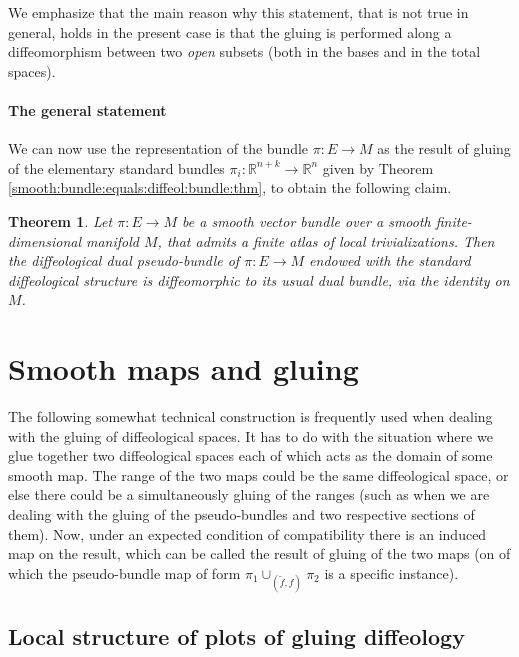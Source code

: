 \documentclass{article}
\newtheorem{thm}[lemma]{Theorem}
\newcommand\matR{{\mathbb{R}}}
\begin{document}
We emphasize that the main reason why this statement, that is not true in general, holds in the present case is that the gluing is performed along a diffeomorphism between two \emph{open} subsets
(both in the bases and in the total spaces).

\paragraph{The general statement} We can now use the representation of the bundle $\pi:E\to M$ as the result of gluing of the elementary standard bundles $\pi_i:\matR^{n+k}\to\matR^n$ given by Theorem
\ref{smooth:bundle:equals:diffeol:bundle:thm}, to obtain the following claim.

\begin{thm}\label{dual:diffeo:equals:dual:standard:thm}
Let $\pi:E\to M$ be a smooth vector bundle over a smooth finite-dimensional manifold $M$, that admits a finite atlas of local trivializations. Then the diffeological dual pseudo-bundle of $\pi:E\to M$ endowed 
with the standard diffeological structure is diffeomorphic to its usual dual bundle, via the identity on $M$.
\end{thm}



\section{Smooth maps and gluing}

The following somewhat technical construction is frequently used when dealing with the gluing of diffeological spaces. It has to do with the situation where we glue together two diffeological spaces each of 
which acts as the domain of some smooth map. The range of the two maps could be the same diffeological space, or else there could be a simultaneously gluing of the ranges (such as when we are
dealing with the gluing of the pseudo-bundles and two respective sections of them). Now, under an expected condition of compatibility there is an induced map on the result, which can be called the
result of gluing of the two maps (on of which the pseudo-bundle map of form $\pi_1\cup_{(\tilde{f},f)}\pi_2$ is a specific instance).


\subsection{Local structure of plots of gluing diffeology}\label{natural:inductions:sect}
\end{document}
